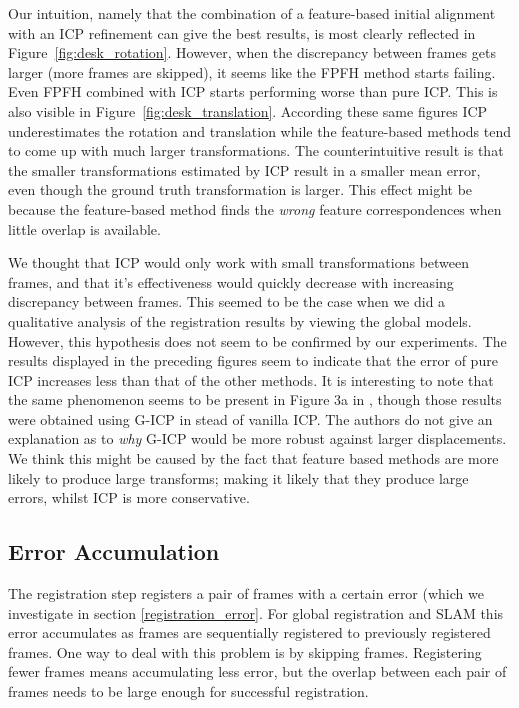 \documentclass[a4paper]{article}
\begin{document}
Our intuition, namely that the combination of a feature-based initial alignment with an \ac{ICP} refinement can give the best results, is most clearly reflected in Figure~\ref{fig:desk_rotation}. However, when the discrepancy between frames gets larger (more frames are skipped), it seems like the \ac{FPFH} method starts failing. Even \ac{FPFH} combined with \ac{ICP} starts performing worse than pure \ac{ICP}. This is also visible in Figure~\ref{fig:desk_translation}. According these same figures \ac{ICP} underestimates the rotation and translation while the feature-based methods tend to come up with much larger transformations. The counterintuitive result is that the smaller transformations estimated by \ac{ICP} result in a smaller mean error, even though the ground truth transformation is larger. This effect might be because the feature-based method finds the \emph{wrong} feature correspondences when little overlap is available.

We thought that \ac{ICP} would only work with small transformations between frames, and that it's effectiveness would quickly decrease with increasing discrepancy between frames. This seemed to be the case when we did a qualitative analysis of the registration results by viewing the global models. However, this hypothesis does not seem to be confirmed by our experiments. The results displayed in the preceding figures seem to indicate that the error of pure \ac{ICP} increases less than that of the other methods. It is interesting to note that the same phenomenon seems to be present in Figure 3a in \cite{steinbruecker_sturm_cremers_iccv11}, though those results were obtained using G-ICP in stead of vanilla \ac{ICP}. The authors do not give an explanation as to \emph{why} G-ICP would be more robust against larger displacements. We think this might be caused by the fact that feature based methods are more likely to produce large transforms; making it likely that they produce large errors, whilst \ac{ICP} is more conservative.

\subsection{Error Accumulation}
\label{accumulated_error}

The registration step registers a pair of frames with a certain error (which we investigate in section \ref{registration_error}. For global registration and \ac{SLAM} this error accumulates as frames are sequentially registered to previously registered frames. One way to deal with this problem is by skipping frames. Registering fewer frames means accumulating less error, but the overlap between each pair of frames needs to be large enough for successful registration. 
\end{document}
